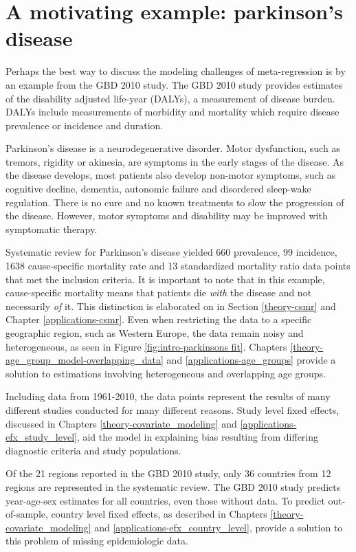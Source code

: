 \section{A motivating example: parkinson's disease}
\label{intro-complete_ex}

Perhaps the best way to discuss the modeling challenges of meta-regression is by an example from the GBD 2010 study.  The GBD 2010 study provides estimates of the disability adjusted life-year (DALYs), a measurement of disease burden.  DALYs include measurements of morbidity and mortality which require disease prevalence or incidence and duration.

Parkinson's disease is a neurodegenerative disorder.  Motor dysfunction, such as tremors, rigidity or akinesia, are symptoms in the early stages of the disease.  As the disease develops, most patients also develop non-motor symptoms, such as cognitive decline, dementia, autonomic failure and disordered sleep-wake regulation.  There is no cure and no known treatments to slow the progression of the disease.  However, motor symptoms and disability may be improved with symptomatic therapy. \cite{poewe_natural_2006, pollock_prevalence_1966}

Systematic review for Parkinson's disease yielded 660 prevalence, 99 incidence, 1638 cause-specific mortality rate and 13 standardized mortality ratio data points that met the inclusion criteria.  It is important to note that in this example, cause-specific mortality means that patients die \emph{with} the disease and not necessarily \emph{of} it.  This distinction is elaborated on in Section \ref{theory-csmr} and Chapter \ref{applications-csmr}.  Even when restricting the data to a specific geographic region, such as Western Europe, the data remain noisy and heterogeneous, as seen in Figure \ref{fig:intro-parkinsons fit}. Chapters \ref{theory-age_group_model-overlapping_data} and \ref{applications-age_groups} provide a solution to estimations involving heterogeneous and overlapping age groups.

Including data from 1961-2010, the data points represent the results of many different studies conducted for many different reasons.  Study level fixed effects, discussed in Chapters \ref{theory-covariate_modeling} and \ref{applications-efx_study_level}, aid the model in explaining bias resulting from differing diagnostic criteria and study populations.

Of the 21 regions reported in the GBD 2010 study, only 36 countries from 12 regions are represented in the systematic review.  The GBD 2010 study predicts year-age-sex estimates for all countries, even those without data.  To predict out-of-sample, country level fixed effects, as described in Chapters \ref{theory-covariate_modeling} and \ref{applications-efx_country_level}, provide a solution to this problem of missing epidemiologic data.


